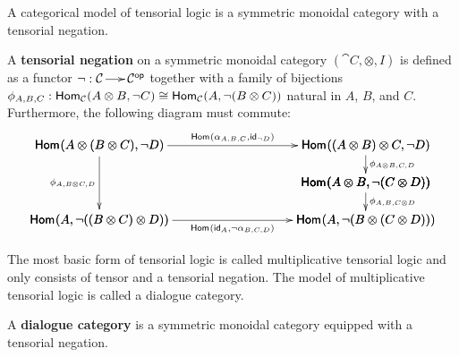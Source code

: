 A categorical model of tensorial logic is a symmetric monoidal
category with a tensorial negation.
\begin{definition}
  \label{def:tensorial-negation}
  A \textbf{tensorial negation} on a symmetric monoidal category
  $(\cat{C},\otimes,I)$ is defined as a functor $\lnot : \mathcal{C} \to
  \mathcal{C}^{\mathsf{op}}$ together with a family of bijections $\phi_{A,B,C} :
  \mathsf{Hom}_{\mathcal{C}}(A \otimes B,\lnot C) \cong \mathsf{Hom}_{\mathcal{C}}(A,\lnot (B \otimes C))$
  natural in $A$, $B$, and $C$.  Furthermore, the following
  diagram must commute:
  \[
  \bfig
  \morphism(0,85)|l|/<-/<0,480>[`;\phi_{A,B \otimes C,D}]
  \vSquares/->``->```->`->/<300,300>%
              [\homs{}{A \otimes (B \otimes C)}{\lnot D}`%
                \homs{}{(A \otimes B) \otimes C}{\lnot D}``%
                \homs{}{A \otimes B}{\lnot (C \otimes D)}`%
                \homs{}{A}{\lnot ((B \otimes C) \otimes D)}`%
                \homs{}{A}{\lnot (B \otimes (C \otimes D))};%
                \homs{}{\alpha_{A,B,C}}{\id_{\lnot D}}``%
                \phi_{A \otimes B,C,D}```%
                \phi_{A,B,C \otimes D}`%
                \homs{}{\id_{A}}{\lnot \alpha_{B,C,D}}]
  \efig
  \]
\end{definition}
The most basic form of tensorial logic is called multiplicative tensorial
logic and only consists of tensor and a tensorial negation.  The model
of multiplicative tensorial logic is called a dialogue category.
\begin{definition}
  \label{def:dialogue-cat}
  A \textbf{dialogue category} is a symmetric monoidal category
  equipped with a tensorial negation.
\end{definition}

